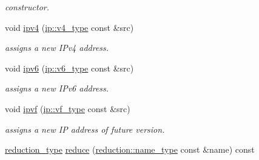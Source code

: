 \begin{DoxyCompactItemize}
\begin{DoxyCompactList}\small\item\em constructor. \end{DoxyCompactList}\item 
void \hyperlink{classhryky_1_1uri_1_1host_1_1_entity_a88a26c69a6db6639dfbffd08997874ac}{ipv4} (\hyperlink{classhryky_1_1ip_1_1v4_1_1_entity}{ip\-::v4\-\_\-type} const \&src)
\begin{DoxyCompactList}\small\item\em assigns a new I\-Pv4 address. \end{DoxyCompactList}\item 
void \hyperlink{classhryky_1_1uri_1_1host_1_1_entity_a3c9de19d7122353cdef3cc499eaaeaba}{ipv6} (\hyperlink{classhryky_1_1ip_1_1v6_1_1_entity}{ip\-::v6\-\_\-type} const \&src)
\begin{DoxyCompactList}\small\item\em assigns a new I\-Pv6 address. \end{DoxyCompactList}\item 
\hypertarget{classhryky_1_1uri_1_1host_1_1_entity_a7a272d7429174d1dbafeb8cc6cd5ab4f}{void \hyperlink{classhryky_1_1uri_1_1host_1_1_entity_a7a272d7429174d1dbafeb8cc6cd5ab4f}{ipvf} (\hyperlink{classhryky_1_1ip_1_1vf_1_1_entity}{ip\-::vf\-\_\-type} const \&src)}\label{classhryky_1_1uri_1_1host_1_1_entity_a7a272d7429174d1dbafeb8cc6cd5ab4f}

\begin{DoxyCompactList}\small\item\em assigns a new I\-P address of future version. \end{DoxyCompactList}\item 
\hypertarget{classhryky_1_1uri_1_1host_1_1_entity_a5430b29ede1bee1b4fa65987e93e2b2a}{\hyperlink{namespacehryky_a343a9a4c36a586be5c2693156200eadc}{reduction\-\_\-type} \hyperlink{classhryky_1_1uri_1_1host_1_1_entity_a5430b29ede1bee1b4fa65987e93e2b2a}{reduce} (\hyperlink{namespacehryky_1_1reduction_ac686c30a4c8d196bbd0f05629a6b921f}{reduction\-::name\-\_\-type} const \&name) const }\label{classhryky_1_1uri_1_1host_1_1_entity_a5430b29ede1bee1b4fa65987e93e2b2a}


\end{DoxyCompactItemize}
